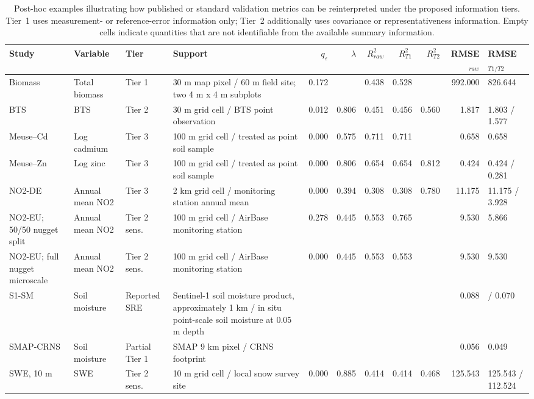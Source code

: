 \begin{table}[t]
\centering
\caption{Post-hoc examples illustrating how published or standard validation metrics can be reinterpreted under the proposed information tiers. Tier~1 uses measurement- or reference-error information only; Tier~2 additionally uses covariance or representativeness information. Empty cells indicate quantities that are not identifiable from the available summary information.}
\label{tab:posthoc-examples}
\small
\begin{tabular}{llllrrrrrrl}
\hline
Study & Variable & Tier & Support & $q_\varepsilon$ & $\lambda$ & $R^2_{raw}$ & $R^2_{T1}$ & $R^2_{T2}$ & RMSE$_{raw}$ & RMSE$_{T1/T2}$ \\
\hline
Biomass & Total biomass & Tier 1 & 30 m map pixel / 60 m field site; two 4 m x 4 m subplots & 0.172 &  & 0.438 & 0.528 &  & 992.000 & 826.644 \\
BTS & BTS & Tier 2 & 30 m grid cell / BTS point observation & 0.012 & 0.806 & 0.451 & 0.456 & 0.560 & 1.817 & 1.803 / 1.577 \\
Meuse--Cd & Log cadmium & Tier 3 & 100 m grid cell / treated as point soil sample & 0.000 & 0.575 & 0.711 & 0.711 &  & 0.658 & 0.658 \\
Meuse--Zn & Log zinc & Tier 3 & 100 m grid cell / treated as point soil sample & 0.000 & 0.806 & 0.654 & 0.654 & 0.812 & 0.424 & 0.424 / 0.281 \\
NO2-DE & Annual mean NO2 & Tier 3 & 2 km grid cell / monitoring station annual mean & 0.000 & 0.394 & 0.308 & 0.308 & 0.780 & 11.175 & 11.175 / 3.928 \\
NO2-EU; 50/50 nugget split & Annual mean NO2 & Tier 2 sens. & 100 m grid cell / AirBase monitoring station & 0.278 & 0.445 & 0.553 & 0.765 &  & 9.530 & 5.866 \\
NO2-EU; full nugget microscale & Annual mean NO2 & Tier 2 sens. & 100 m grid cell / AirBase monitoring station & 0.000 & 0.445 & 0.553 & 0.553 &  & 9.530 & 9.530 \\
S1-SM & Soil moisture & Reported SRE & Sentinel-1 soil moisture product, approximately 1 km / in situ point-scale soil moisture at 0.05 m depth &  &  &  &  &  & 0.088 &  / 0.070 \\
SMAP-CRNS & Soil moisture & Partial Tier 1 & SMAP 9 km pixel / CRNS footprint &  &  &  &  &  & 0.056 & 0.049 \\
SWE, 10 m & SWE & Tier 2 sens. & 10 m grid cell / local snow survey site & 0.000 & 0.885 & 0.414 & 0.414 & 0.468 & 125.543 & 125.543 / 112.524 \\

\end{tabular}
\end{table}
